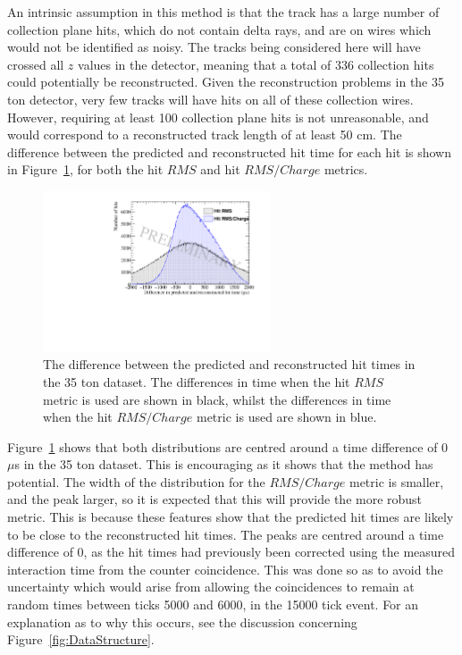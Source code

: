 An intrinsic assumption in this method is that the track has a large number of collection plane hits, which do not contain delta rays, and are on wires which would not be identified as noisy. The tracks being considered here will have crossed all $z$ values in the detector, meaning that a total of 336 collection hits could potentially be reconstructed. Given the reconstruction problems in the 35 ton detector, very few tracks will have hits on all of these collection wires. However, requiring at least 100 collection plane hits is not unreasonable, and would correspond to a reconstructed track length of at least 50 cm. The difference between the predicted and reconstructed hit time for each hit is shown in Figure~\ref{fig:DiffDataPredHit}, for both the hit $RMS$ and hit $RMS/Charge$ metrics. \\

\begin{figure}[h!]
  \centering
  \includegraphics[width=0.6\textwidth]{DifferenceInteractionTime_Data}
  \caption[The difference between the predicted and reconstructed hit times in the 35 ton dataset]
          {The difference between the predicted and reconstructed hit times in the 35 ton dataset. The differences in time when the hit $RMS$ metric is used are shown in black, whilst the differences in time when the hit $RMS/Charge$ metric is used are shown in blue.}
  \label{fig:DiffDataPredHit}
\end{figure}

Figure~\ref{fig:DiffDataPredHit} shows that both distributions are centred around a time difference of 0 $\mu$s in the 35 ton dataset. This is encouraging as it shows that the method has potential. The width of the distribution for the $RMS/Charge$ metric is smaller, and the peak larger, so it is expected that this will provide the more robust metric. This is because these features show that the predicted hit times are likely to be close to the reconstructed hit times. The peaks are centred around a time difference of 0, as the hit times had previously been corrected using the measured interaction time from the counter coincidence. This was done so as to avoid the uncertainty which would arise from allowing the coincidences to remain at random times between ticks 5000 and 6000, in the 15000 tick event. For an explanation as to why this occurs, see the discussion concerning Figure~\ref{fig:DataStructure}. \\

